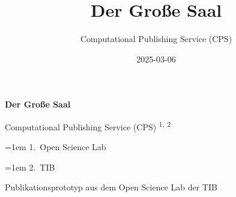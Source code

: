 \documentclass[
  a4paper,
  openany]{book}
\title{Der Große Saal}
\author{Computational Publishing Service (CPS)}
\date{2025-03-06}
\begin{document}
  \begin{frontmatter}
  \begin{titlepage}






  \begin{tcolorbox}


  \centering

  {\headingfont\Huge\bfseries\nohyphens{Der Große
  Saal}}\\[1\baselineskip]

  \end{tcolorbox}

  \bigbreak

  \begin{tcolorbox}
  \centering
      {\centering\large{Computational Publishing Service (CPS)}}%
      {\textsuperscript{1}}\textsuperscript{,}%
      {\textsuperscript{2}}%


  \vspace{2\baselineskip} 

  \hangindent=1em
  {1}.~{Open Science Lab}%
  \par\hangindent=1em%
  {2}.~{TIB}%


  \vspace{1\baselineskip} 


  \end{tcolorbox}



  \vfill

  \vspace{1\baselineskip} 

  \begin{tcolorbox}
  \centering

  {
    Publikationsprototyp aus dem Open Science Lab der TIB
  }
  \end{tcolorbox}
  \end{titlepage}
  \end{frontmatter}
\end{document}
